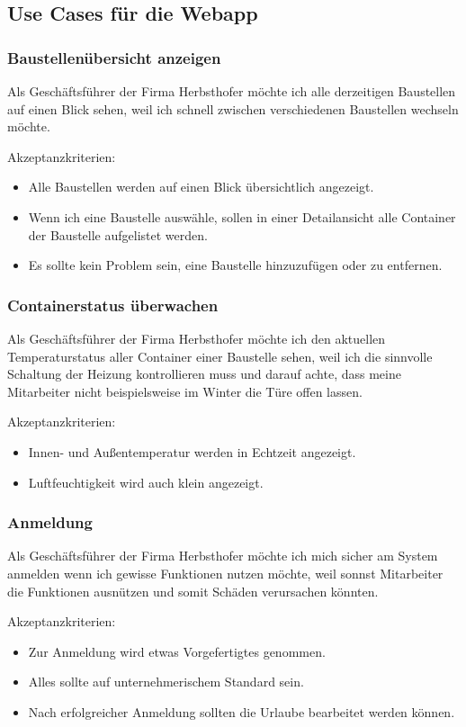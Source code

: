 \subsection{Use Cases für die Webapp}

\subsubsection{Baustellenübersicht anzeigen}
Als Geschäftsführer der Firma Herbsthofer möchte ich alle derzeitigen Baustellen auf einen Blick sehen, weil ich schnell zwischen verschiedenen Baustellen wechseln möchte.

Akzeptanzkriterien:
\begin{itemize}
    \item Alle Baustellen werden auf einen Blick übersichtlich angezeigt.
    \item Wenn ich eine Baustelle auswähle, sollen in einer Detailansicht alle Container der Baustelle aufgelistet werden.
    \item Es sollte kein Problem sein, eine Baustelle hinzuzufügen oder zu entfernen.
\end{itemize}

\subsubsection{Containerstatus überwachen}
Als Geschäftsführer der Firma Herbsthofer  möchte ich den aktuellen Temperaturstatus aller Container einer Baustelle sehen, weil ich die sinnvolle Schaltung der Heizung kontrollieren muss und darauf achte, dass meine Mitarbeiter nicht beispielsweise im Winter die Türe offen lassen.

Akzeptanzkriterien:
\begin{itemize}
    \item Innen- und Außentemperatur werden in Echtzeit angezeigt.
    \item Luftfeuchtigkeit wird auch klein angezeigt.
\end{itemize}


\subsubsection{Anmeldung}
Als Geschäftsführer der Firma Herbsthofer  möchte ich mich sicher am System anmelden wenn ich gewisse Funktionen nutzen möchte, weil sonnst Mitarbeiter die Funktionen ausnützen und somit Schäden verursachen könnten.

Akzeptanzkriterien:
\begin{itemize}
    \item Zur Anmeldung wird etwas Vorgefertigtes genommen.
    \item Alles sollte auf unternehmerischem Standard sein.
    \item Nach erfolgreicher Anmeldung sollten die Urlaube bearbeitet werden können.
\end{itemize}

